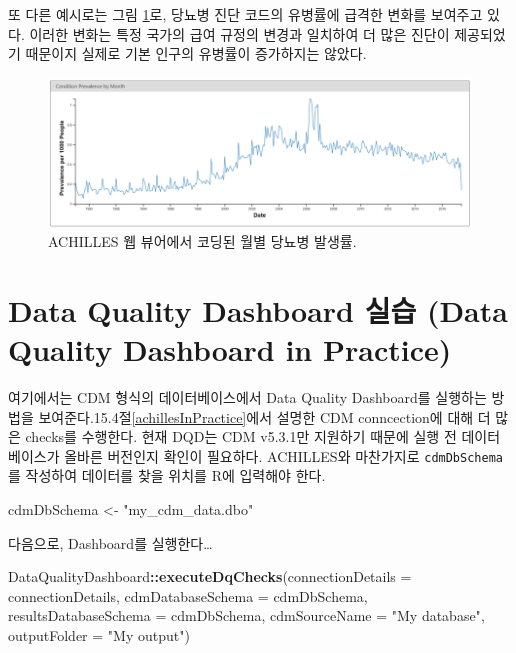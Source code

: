 \documentclass[11pt]{book}
\newenvironment{Shaded}{\begin{snugshade}}{\end{snugshade}}
\newcommand{\KeywordTok}[1]{\textcolor[rgb]{0.13,0.29,0.53}{\textbf{#1}}}
\newcommand{\DataTypeTok}[1]{\textcolor[rgb]{0.13,0.29,0.53}{#1}}
\newcommand{\StringTok}[1]{\textcolor[rgb]{0.31,0.60,0.02}{#1}}
\newcommand{\OperatorTok}[1]{\textcolor[rgb]{0.81,0.36,0.00}{\textbf{#1}}}
\newcommand{\NormalTok}[1]{#1}
\theoremstyle{definition}
\theoremstyle{definition}
\theoremstyle{definition}
\theoremstyle{remark}
\begin{document}
또 다른 예시로는 그림 \ref{fig:achillesCodeChange}로, 당뇨병 진단 코드의
유병률에 급격한 변화를 보여주고 있다. 이러한 변화는 특정 국가의 급여
규정의 변경과 일치하여 더 많은 진단이 제공되었기 때문이지 실제로 기본
인구의 유병률이 증가하지는 않았다.

\begin{figure}

{\centering \includegraphics[width=1\linewidth]{images/DataQuality/achillesCodeChange} 

}

\caption{ACHILLES 웹 뷰어에서 코딩된 월별 당뇨병 발생률.}\label{fig:achillesCodeChange}
\end{figure}

\section{Data Quality Dashboard 실습 (Data Quality Dashboard in
Practice)}\label{dqdInPractice}

여기에서는 CDM 형식의 데이터베이스에서 Data Quality Dashboard를 실행하는
방법을 보여준다.15.4절\ref{achillesInPractice}에서 설명한 CDM
conncection에 대해 더 많은 checks를 수행한다. 현재 DQD는 CDM v5.3.1만
지원하기 때문에 실행 전 데이터베이스가 올바른 버전인지 확인이 필요하다.
ACHILLES와 마찬가지로 \texttt{cdmDbSchema}를 작성하여 데이터를 찾을
위치를 R에 입력해야 한다.

\begin{Shaded}
\begin{Highlighting}[]
\NormalTok{cdmDbSchema <-}\StringTok{ "my_cdm_data.dbo"}
\end{Highlighting}
\end{Shaded}

다음으로, Dashboard를 실행한다\ldots{}

\begin{Shaded}
\begin{Highlighting}[]
\NormalTok{DataQualityDashboard}\OperatorTok{::}\KeywordTok{executeDqChecks}\NormalTok{(}\DataTypeTok{connectionDetails =}\NormalTok{ connectionDetails, }
                                      \DataTypeTok{cdmDatabaseSchema =}\NormalTok{ cdmDbSchema, }
                                      \DataTypeTok{resultsDatabaseSchema =}\NormalTok{ cdmDbSchema,}
                                      \DataTypeTok{cdmSourceName =} \StringTok{"My database"}\NormalTok{,}
                                      \DataTypeTok{outputFolder =} \StringTok{"My output"}\NormalTok{)}
\end{Highlighting}
\end{Shaded}
\end{document}
